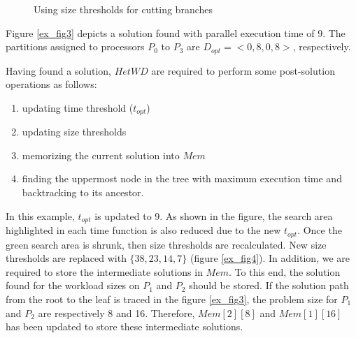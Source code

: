 \documentclass[12pt]{article}
\begin{document}
\begin{figure}[!t]
	\centering
	\caption{Using size thresholds for cutting branches}
	\label{ex_fig2}
\end{figure}

Figure \ref{ex_fig3} depicts a solution found with parallel execution time of 9. The partitions assigned to processors $P_0$ to $P_3$ are $D_{opt}=<0,8,0,8>$, respectively.

Having found a solution, $HetWD$ are required to perform some post-solution operations as follows:
\begin{enumerate}
	\item updating time threshold ($t_{opt}$)
	\item updating size thresholds
	\item memorizing the current solution into $Mem$
	\item finding the uppermost node in the tree with maximum execution time and backtracking to its ancestor.
\end{enumerate}

In this example, $t_{opt}$ is updated to 9. As shown in the figure, the search area highlighted in each time function is also reduced due to the new $t_{opt}$. Once the green search area is shrunk, then size thresholds are recalculated. New size thresholds are replaced with $\{38,23,14,7\}$ (figure \ref{ex_fig4}). In addition, we are required to store the intermediate solutions in $Mem$. To this end, the solution found for the workload sizes on $P_1$ and $P_2$ should be stored. If the solution path from the root to the leaf is traced in the figure \ref{ex_fig3}, the problem size for $P_1$ and $P_2$ are respectively 8 and 16. Therefore, $Mem[2][8]$ and $Mem[1][16]$ has been updated to store these intermediate solutions. 
\end{document}
